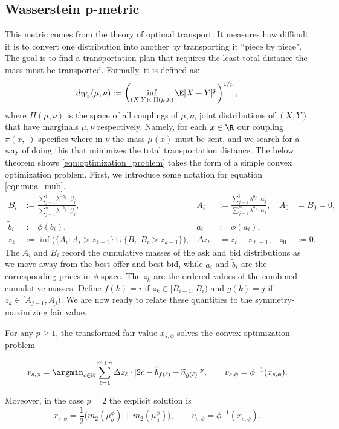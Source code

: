 \subsection{Wasserstein p-metric}

This metric comes from the theory of optimal transport. It measures how
 difficult it is to convert one distribution into another by transporting
 it ``piece by piece". The goal is to find a transportation plan that
 requires the least total distance the mass must be transported.
 Formally, it is defined as:
%
\[d_{W_p}(\mu, \nu) := \left( \inf_{(X,Y) \in \Pi(\mu, \nu)} \E |X-Y|^p \right)^{1/p},\]
%
\noindent where $\Pi(\mu, \nu)$ is the space of all couplings of $\mu, \nu$, joint distributions of $(X,Y)$ that have marginals $\mu, \nu$ respectively. Namely, for each $x \in \R$ our coupling $\pi(x, \cdot)$ specifies where in $\nu$ the mass $\mu(x)$ must be sent, and we search for a way of doing this that minimizes the total transportation distance. The below theorem shows \eqref{eqn:optimization_problem} takes the form of a simple convex optimization problem. First, we introduce some notation for equation \eqref{eqn:mua_mub}.
%
\begin{align*}
    B_i &:= \frac{\sum_{j=1}^i\lambda^{-b_j} \cdot \beta_j}{\sum_{j=1}^n \lambda^{-b_j} \cdot \beta_j},
    &A_i &:= \frac{\sum_{j=1}^i\lambda^{a_j} \cdot \alpha_j}{\sum_{j=1}^m \lambda^{a_j} \cdot \alpha_j},
    &A_0&=B_0=0,\\
    \widetilde b_i&:=\phi(b_i),
    &\widetilde a_i&:=\phi(a_i),\\
    z_k &:= \inf \bigl(\{A_i:A_i>z_{k-1}\}\cup\{B_i:B_i>z_{k-1}\}\bigr),
    &\Delta z_\ell&:=z_\ell-z_{\ell-1},
    &z_0&:=0.
\end{align*}
%
\noindent The $A_i$ and $B_i$ record the cumulative masses of the ask and bid
distributions as we move away from the best offer and best bid, while
$\widetilde a_i$ and $\widetilde b_i$ are the corresponding prices in
$\phi$-space. The $z_k$ are the ordered values of the combined cumulative
masses. Define $f(k)=i$ if $z_k\in[B_{i-1},B_i)$ and $g(k)=j$ if
$z_k\in[A_{j-1},A_j)$. We are now ready to relate these quantities to the
symmetry-maximizing fair value.
%
\begin{theorem}
    For any $p \geq 1$, the transformed fair value $x_{s,\phi}$ solves the convex optimization problem

    \begin{equation}
    x_{s,\phi} = \argmin_{c \in \mathbb R} \sum_{\ell = 1}^{m+n} \Delta z_\ell \cdot
    |2c - \widetilde b_{f(\ell)} - \widetilde a_{g(\ell)}|^p,
    \qquad v_{s,\phi}=\phi^{-1}(x_{s,\phi}).
    \end{equation}

    \noindent Moreover, in the case $p = 2$ the explicit solution is
    \begin{equation}
        x_{s,\phi}=\frac{1}{2}\Big(m_2(\mu_b^\phi)+m_2(\mu_a^\phi)\Big),
        \qquad v_{s,\phi}=\phi^{-1}(x_{s,\phi}).
        \label{eqn:explicit_soln_sym_fv}
    \end{equation}
    \label{thm:wasserstein_solution}
\end{theorem}
